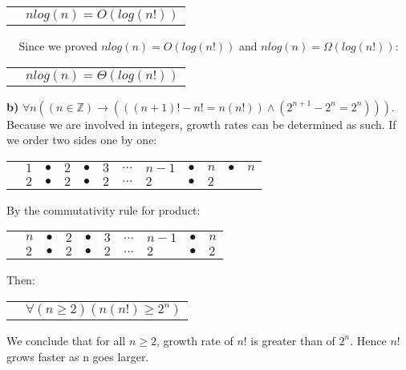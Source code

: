 \documentclass[11pt]{article}
\begin{document}
    \begin{tabular}{l l}
        & $nlog(n)=O(log(n!))$ \\
    \end{tabular}
    \begin{flushleft}
        $\>\>\>\>\>$Since we proved $nlog(n)=O(log(n!))$ and $nlog(n)=\Omega(log(n!))$:\\
    \end{flushleft}
    \begin{tabular}{l l}
        & $nlog(n)=\Theta(log(n!))$ \\
    \end{tabular}

\begin{flushleft}
    \textbf{b)} $\forall n ((n \in \mathbb{Z}) \rightarrow (((n+1)!-n!=n(n!)) \land (2^{n+1}-2^{n}=2^{n})))$. Because we are involved in integers, 
    growth rates can be determined as such. If we order two sides one by one:\\
\end{flushleft}
\begin{tabular}{l l l l l l l l l l l l}
    & $1$ & $\bullet$ & $2$ & $\bullet$ & $3$ & $ ... $ & $n-1$ & $\bullet$ & $n$ & $\bullet$ & $n$\\
    & $2$ & $\bullet$ & $2$ & $\bullet$ & $2$ & $ ... $ & $2$ & $\bullet$ & $2$ & &\\
\end{tabular}
\begin{flushleft}
    By the commutativity rule for product:
\end{flushleft}
\begin{tabular}{l l l l l l l l l l}
    & $n$ & $\bullet$ & $2$ & $\bullet$ & $3$ & $ ... $ & $n-1$ & $\bullet$ & $n$\\
    & $2$ & $\bullet$ & $2$ & $\bullet$ & $2$ & $ ... $ & $2$ & $\bullet$ & $2$\\
\end{tabular}
\begin{flushleft}
    Then:
\end{flushleft}
\begin{tabular}{l l}
    & $\forall (n \geq 2) (n(n!) \geq 2^{n})$ \\
\end{tabular}
\begin{flushleft}
    We conclude that for all $n \geq 2$, growth rate of $n!$ is greater than of $2^{n}$. Hence $n!$ grows faster as n goes larger. \\
\end{flushleft}
\end{document}
